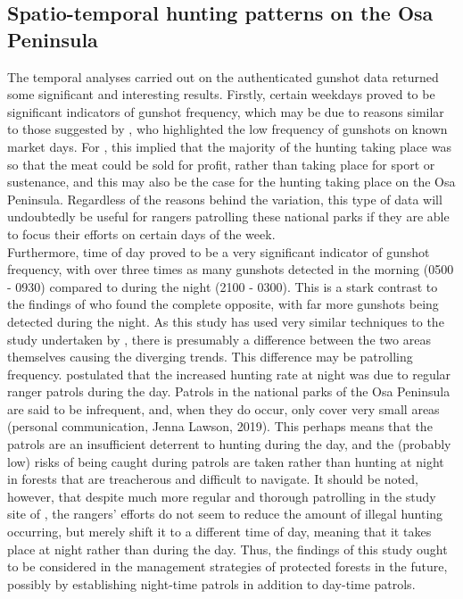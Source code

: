 \subsection{Spatio-temporal hunting patterns on the Osa Peninsula}
The temporal analyses carried out on the authenticated gunshot data returned some significant and interesting results. Firstly, certain weekdays proved  to be significant indicators of gunshot frequency, which may be due to reasons similar to those suggested by \cite{Astaras2017}, who highlighted the low frequency of gunshots on known market days. For \cite{Astaras2017}, this implied that the majority of the hunting taking place was so that the meat could be sold for profit, rather than taking place for sport or sustenance, and this may also be the case for the hunting taking place on the Osa Peninsula. Regardless of the reasons behind the variation, this type of data will undoubtedly be useful for rangers patrolling these national parks if they are able to focus their efforts on certain days of the week. \\

\noindent Furthermore, time of day proved to be a very significant indicator of gunshot frequency, with over three times as many gunshots detected in the morning (0500 - 0930) compared to during the night (2100 - 0300). This is a stark contrast to the findings of \cite{Astaras2017} who found the complete opposite, with far more gunshots being detected during the night. As this study has used very similar techniques to the study undertaken by \cite{Astaras2017}, there is presumably a difference between the two areas themselves causing the diverging trends. This difference may be patrolling frequency. \cite{Astaras2017} postulated that the increased hunting rate at night was due to regular ranger patrols during the day. Patrols in the national parks of the Osa Peninsula are said to be infrequent, and, when they do occur, only cover very small areas (personal communication, Jenna Lawson, 2019). This perhaps means that the patrols are an insufficient deterrent to hunting during the day, and the (probably low) risks of being caught during patrols are taken rather than hunting at night in forests that are treacherous and difficult to navigate. It should be noted, however, that despite much more regular and thorough patrolling in the study site of \cite{Astaras2017}, the rangers' efforts do not seem to reduce the amount of illegal hunting occurring, but merely shift it to a different time of day, meaning that it takes place at night rather than during the day. Thus, the findings of this study ought to be considered in the management strategies of protected forests in the future, possibly by establishing night-time patrols in addition to day-time patrols.
